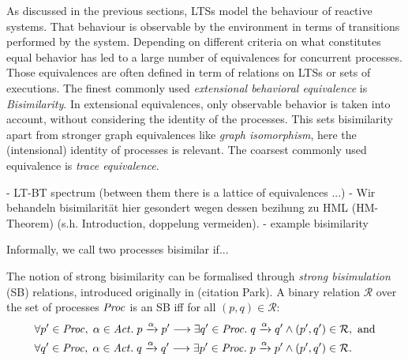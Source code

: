 %
\begin{isabellebody}%
%
%
\isadelimtheory
%
\endisadelimtheory
%
\isatagtheory
%
\endisatagtheory
{\isafoldtheory}%
%
\isadelimtheory
%
\endisadelimtheory
%
\isadelimdocument
%
\endisadelimdocument
%
\isatagdocument
%
\isamarkuptrue%
%
\endisatagdocument
{\isafolddocument}%
%
\isadelimdocument
%
\endisadelimdocument
%
\begin{isamarkuptext}%
As discussed in the previous sections, LTSs model the behaviour of reactive systems. That behaviour
is observable by the environment in terms of transitions performed by the system. Depending on different criteria
on what constitutes equal behavior has led to a large number of equivalences for concurrent processes. Those equivalences are often
defined in term of relations on LTSs or sets of executions. The finest commonly used \textit{extensional behavioral equivalence}
is \textit{Bisimilarity}. In extensional equivalences, only observable behavior is taken into account, without considering the
identity of the processes. This sets bisimilarity apart from stronger graph equivalences like \textit{graph isomorphism}, 
here the (intensional) identity of processes is relevant. The coarsest commonly used equivalence is \textit{trace equivalence}.

- LT-BT spectrum (between them there is a lattice of equivalences ...)
- Wir behandeln bisimilarität hier gesondert wegen dessen bezihung zu HML (HM-Theorem) (s.h. Introduction, doppelung vermeiden).
- example bisimilarity

Informally, we call two processes bisimilar if...%
\end{isamarkuptext}\isamarkuptrue%
%
\isadelimdocument
%
\endisadelimdocument
%
\isatagdocument
%
\isamarkuptrue%
%
\endisatagdocument
{\isafolddocument}%
%
\isadelimdocument
%
\endisadelimdocument
%
\begin{isamarkuptext}%
The notion of strong bisimilarity can be formalised through \emph{strong bisimulation} (SB) relations, introduced originally in (citation Park). 
A binary relation $\mathcal{R}$ over the set of processes $\mathit{Proc}$ is an SB iff for all $(p,q) \in \mathcal{R}$:
\begin{align*}
&\forall p' \in \mathit{Proc},\; \alpha \in \mathit{Act} .\; p \xrightarrow{\alpha} p' \longrightarrow
\exists q' \in \mathit{Proc} .\; q \xrightarrow{\alpha} q' \wedge (p',q') \in \mathcal{R}, \text{ and}\\
&\forall q' \in \mathit{Proc},\; \alpha \in \mathit{Act} .\; q \xrightarrow{\alpha} q' \longrightarrow
\exists p' \in \mathit{Proc} .\; p \xrightarrow{\alpha} p' \wedge (p',q') \in \mathcal{R}.
\end{align*}%
\end{isamarkuptext}\isamarkuptrue%
%
\isadelimtheory
%
\endisadelimtheory
%
\isatagtheory
{}\isamarkupfalse%
%
\endisatagtheory
{\isafoldtheory}%
%
\isadelimtheory
%
\endisadelimtheory
%
\end{isabellebody}%
